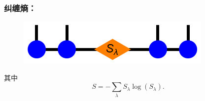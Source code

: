 \documentclass[UTF8]{ctexart}
\begin{document}
\subsubsection*{纠缠熵：} 
\begin{figure}[H]
\begin{centering}
\includegraphics[width=0.4\linewidth]{include/p10}
\par\end{centering}
\end{figure}
\noindent 其中
\begin{equation}
	S=-\sum_{\lambda}S_{\lambda}\log\left(S_{\lambda}\right).
\end{equation}
\end{document}

